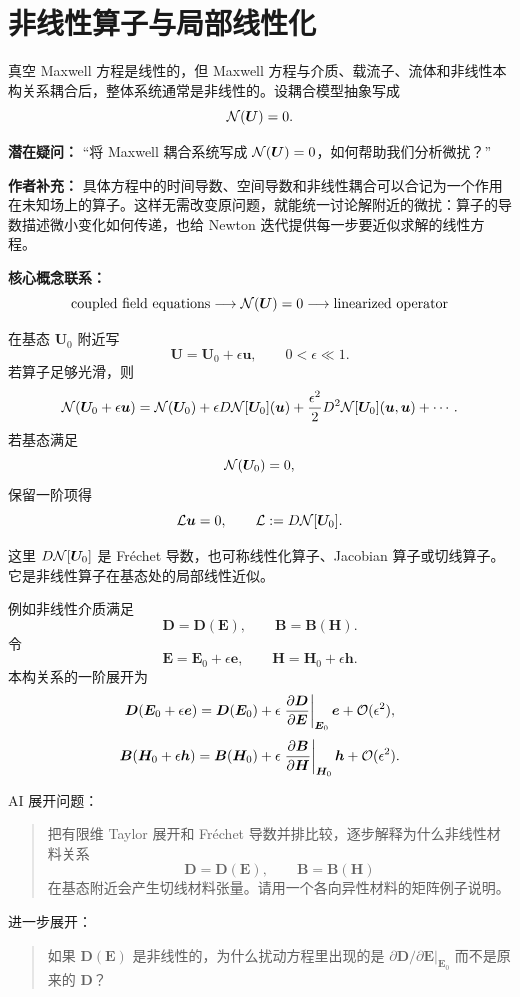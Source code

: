 \section{非线性算子与局部线性化}
真空 Maxwell 方程是线性的，但 Maxwell 方程与介质、载流子、流体和非线性本构关系耦合后，整体系统通常是非线性的。设耦合模型抽象写成
\[
\mathcal N(\bm U)=0.
\]

\begin{authornote}
\textbf{潜在疑问：}
“将 Maxwell 耦合系统写成 \(\mathcal N(\bm U)=0\)，如何帮助我们分析微扰？”

\textbf{作者补充：}
具体方程中的时间导数、空间导数和非线性耦合可以合记为一个作用在未知场上的算子。这样无需改变原问题，就能统一讨论解附近的微扰：算子的导数描述微小变化如何传递，也给 Newton 迭代提供每一步要近似求解的线性方程。

\textbf{核心概念联系：}
\[
\text{coupled field equations}
\longrightarrow
\mathcal N(\bm U)=0
\longrightarrow
\text{linearized operator}
\]
\end{authornote}

在基态 \(\bm U_0\) 附近写
\[
\bm U=\bm U_0+\epsilon\bm u,
\qquad 0<\epsilon\ll1.
\]
若算子足够光滑，则
\[
\mathcal N(\bm U_0+\epsilon\bm u)
=
\mathcal N(\bm U_0)
+\epsilon D\mathcal N[\bm U_0](\bm u)
+\frac{\epsilon^2}{2}
D^2\mathcal N[\bm U_0](\bm u,\bm u)
+\cdots.
\]
若基态满足
\[
\mathcal N(\bm U_0)=0,
\]
保留一阶项得
\[
\mathcal L\bm u=0,
\qquad
\mathcal L:=D\mathcal N[\bm U_0].
\]

这里 \(D\mathcal N[\bm U_0]\) 是 Fr\'echet 导数，也可称线性化算子、Jacobian 算子或切线算子。它是非线性算子在基态处的局部线性近似。

例如非线性介质满足
\[
\bm D=\bm D(\bm E),
\qquad
\bm B=\bm B(\bm H).
\]
令
\[
\bm E=\bm E_0+\epsilon\bm e,
\qquad
\bm H=\bm H_0+\epsilon\bm h.
\]
本构关系的一阶展开为
\[
\bm D(\bm E_0+\epsilon\bm e)
=
\bm D(\bm E_0)
+
\epsilon
\left.
\frac{\partial\bm D}{\partial\bm E}
\right|_{\bm E_0}\bm e
+\mathcal O(\epsilon^2),
\]
\[
\bm B(\bm H_0+\epsilon\bm h)
=
\bm B(\bm H_0)
+
\epsilon
\left.
\frac{\partial\bm B}{\partial\bm H}
\right|_{\bm H_0}\bm h
+\mathcal O(\epsilon^2).
\]

\begin{askai}
AI 展开问题：
\begin{quote}
把有限维 Taylor 展开和 Fr\'echet 导数并排比较，逐步解释为什么非线性材料关系
\[
\bm D=\bm D(\bm E),\qquad \bm B=\bm B(\bm H)
\]
在基态附近会产生切线材料张量。请用一个各向异性材料的矩阵例子说明。
\end{quote}

进一步展开：
\begin{quote}
如果 \(\bm D(\bm E)\) 是非线性的，为什么扰动方程里出现的是 \(\partial\bm D/\partial\bm E|_{\bm E_0}\) 而不是原来的 \(\bm D\)？
\end{quote}
\end{askai}

